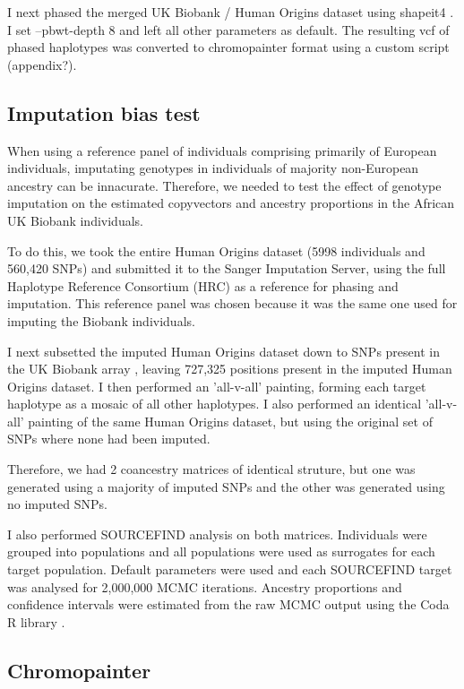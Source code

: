 I next phased the merged UK Biobank / Human Origins dataset using shapeit4 \cite{delaneau2018integrative}. I set --pbwt-depth 8 and left all other parameters as default. The resulting vcf of phased haplotypes was converted to chromopainter format using a custom script (appendix?).  

\subsection{Imputation bias test}

When using a reference panel of individuals comprising primarily of European individuals, imputating genotypes in individuals of majority non-European ancestry can be innacurate. Therefore, we needed to test the effect of genotype imputation on the estimated copyvectors and ancestry proportions in the African UK Biobank individuals. 

To do this, we took the entire Human Origins dataset (5998 individuals and 560,420 SNPs) and submitted it to the Sanger Imputation Server, using the full Haplotype Reference Consortium (HRC) as a reference for phasing and imputation. This reference panel was chosen because it was the same one used for imputing the Biobank individuals.

I next subsetted the imputed Human Origins dataset down to SNPs present in the UK Biobank array , leaving 727,325 positions present in the imputed Human Origins dataset. I then performed an 'all-v-all' painting, forming each target haplotype as a mosaic of all other haplotypes. I also performed an identical 'all-v-all' painting of the same Human Origins dataset, but using the original set of SNPs where none had been imputed. 

Therefore, we had 2 coancestry matrices of identical struture, but one was generated using a majority of imputed SNPs and the other was generated using no imputed SNPs. 

I also performed SOURCEFIND analysis on both matrices. Individuals were grouped into populations and all populations were used as surrogates for each target population. Default parameters were used and each SOURCEFIND target was analysed for 2,000,000 MCMC iterations. Ancestry proportions and confidence intervals were estimated from the raw MCMC output using the Coda R library \cite{oro22547}.

\subsection{Chromopainter}

